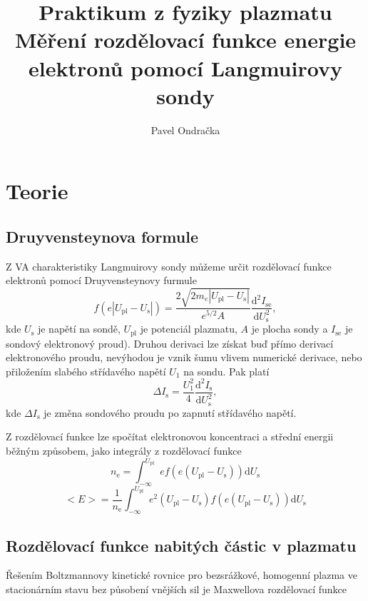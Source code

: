 \documentclass[12pt]{article}
\begin{document}
\title{Praktikum z fyziky plazmatu \\
Měření rozdělovací funkce energie elektronů pomocí Langmuirovy sondy}
\author{Pavel Ondračka}
\maketitle

\section{Teorie}

\subsection{Druyvensteynova formule}

Z VA charakteristiky Langmuirovy sondy můžeme určit rozdělovací funkce elektronů pomocí Druy\-ven\-steynovy furmule
\begin{equation}
f(e|U_\mathrm{pl}-U_\mathrm{s}|)= \frac{2 \sqrt{2 m_e |U_\mathrm{pl}-U_\mathrm{s}|}}{e^{5/2} A} \frac{\mathrm{d}^2 I_\mathrm{se}}{\mathrm{d}U_\mathrm{s}^2} \mathrm{,}
\end{equation}
kde $U_\mathrm{s}$ je napětí na sondě, $U_\mathrm{pl}$ je potenciál plazmatu, $A$ je plocha sondy a $I_\mathrm{se}$ je sondový elektronový proud). Druhou derivaci lze získat buď přímo derivací elektronového proudu, nevýhodou je vznik šumu vlivem numerické derivace, nebo přiložením slabého střídavého napětí $U_1$ na sondu. Pak platí
\begin{equation}
\Delta I_\mathrm{s} = \frac{U_1^2}{4} \frac{\mathrm{d}^2 I_\mathrm{s}}{\mathrm{d}U_\mathrm{s}^2} \mathrm{,}
\end{equation}
kde $\Delta I_\mathrm{s}$ je změna sondového proudu po zapnutí střídavého napětí.

Z rozdělovací funkce lze spočítat elektronovou koncentraci a střední energii běžným způsobem, jako integrály z rozdělovací funkce
\begin{equation}
n_\mathrm{e} = \int_{-\infty}^{U_\mathrm{pl}} e f(e(U_\mathrm{pl}-U_\mathrm{s})) \mathrm{d}U_\mathrm{s}
\end{equation}
\begin{equation}
<E> =  \frac{1}{n_\mathrm{e}} \int_{-\infty}^{U_\mathrm{pl}} e^2 (U_\mathrm{pl}-U_\mathrm{s}) f(e(U_\mathrm{pl}-U_\mathrm{s}))  \mathrm{d}U_\mathrm{s}
\end{equation}

\subsection{Rozdělovací funkce nabitých částic v plazmatu}
Řešením Boltzmannovy kinetické rovnice pro bezsrážkové, homogenní plazma ve stacionárním stavu bez působení vnějších sil je Maxwellova rozdělovací funkce
\end{document}
